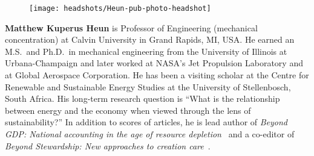 \setlength{\intextsep}{-7pt}%
\setlength{\columnsep}{8pt}%
\begin{figure}
  \begin{center}
    \texttt{[image: headshots/Heun-pub-photo-headshot]}
  \end{center}
\end{figure}
\textbf{Matthew Kuperus Heun} is Professor of Engineering 
(mechanical concentration)
at Calvin University in Grand Rapids, MI, USA.
He earned an M.S.\ and Ph.D.\ in mechanical engineering from 
the University of Illinois at Urbana-Champaign and 
later worked at NASA's Jet Propulsion Laboratory and at Global Aerospace Corporation. 
He has been a visiting scholar at the Centre for Renewable and Sustainable Energy Studies 
at the University of Stellenbosch, South Africa. 
His long-term research question is 
``What is the relationship between energy and the economy when viewed through the lens of sustainability?''
In addition to scores of articles, he is lead author of 
\emph{Beyond GDP: National accounting in the age of resource depletion}~\citep{Heun:2015aa} 
and a co-editor of
\emph{Beyond Stewardship: New approaches to creation care}~\citep{Warners:2019aa}.
